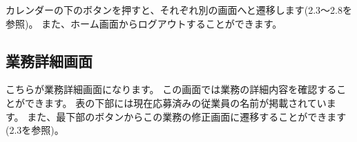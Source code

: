 \documentclass[11pt, a4paper]{jarticle}
\begin{document}
		カレンダーの下のボタンを押すと、それぞれ別の画面へと遷移します(2.3〜2.8を参照)。
		また、ホーム画面からログアウトすることができます。
		\clearpage


	\subsection{業務詳細画面}
		\begin{figure}[htbp]
			\centering
		\end{figure}
		こちらが業務詳細画面になります。
		この画面では業務の詳細内容を確認することができます。
		表の下部には現在応募済みの従業員の名前が掲載されています。
		また、最下部のボタンからこの業務の修正画面に遷移することができます(2.3を参照)。
		\clearpage
\end{document}
